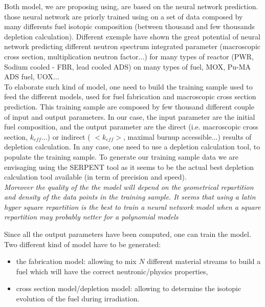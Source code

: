 \documentclass[dvips,12pt]{article}
\begin{document}
	
Both model, we are proposing using, are based on the neural network prediction. those neural network are priorly trained using on a set of data composed by many differents fuel isotopic composition (between thousand and few thousands depletion calculation).
Different exemple have shown the great potential of neural network predicting different neutron spectrum integrated parameter (macroscopic cross section, multiplication neutron factor...) for many types of reactor (PWR, Sodium cooled - FBR,  lead cooled ADS) on many types of fuel, MOX, Pu-MA ADS fuel, UOX...\\

 
To elaborate such kind of model, one need to build the training sample used to feed the different models, used for fuel fabrication and macroscopic cross section prediction.
This training sample are composed by few thousand different couple of input and output parameters. In our case, the input parameter are the initial fuel composition, and the output parameter are the direct (i.e. macroscopic cross section, $k_{eff}$...) or indirect ( $<k_{eff}>$, maximal burnup accessible...) results of depletion calculation. 
In any case, one need to use a depletion calculation tool, to populate the training sample. 
To generate our training sample data we are envisaging using the SERPENT tool as it seems to be the actual best depletion calculation tool available (in term of precision and speed).%
\\
\textit{Moreover the quality of the the model will depend on the geometrical repartition and density of the data points in the training sample.
It seems that using a latin hyper square repartition \cite{} is the best to train a neural network model when a square repartition may probably netter for a polynomial models } %

Since all the output parameters have been computed, one can train the model. Two different kind of model have to be generated: 
\begin{itemize}
\item the fabrication model: allowing to mix $N$ different material streams to build a fuel which will have the correct neutronic/physics properties,
\item cross section model/depletion model: allowing to determine the isotopic evolution of the fuel during irradiation.
\end{itemize}
\end{document}
